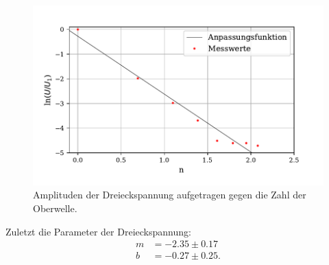 \begin{figure}
  \centering
  \includegraphics{plot3.pdf}
  \caption{Amplituden der Dreieckspannung aufgetragen gegen die Zahl der Oberwelle.}
  \label{fig:rechteck}
\end{figure}
Zuletzt die Parameter der Dreieckspannung:
\begin{align*}
  m &= -2.35 \pm 0.17 \\
  b &= -0.27 \pm 0.25 .
\end{align*}


